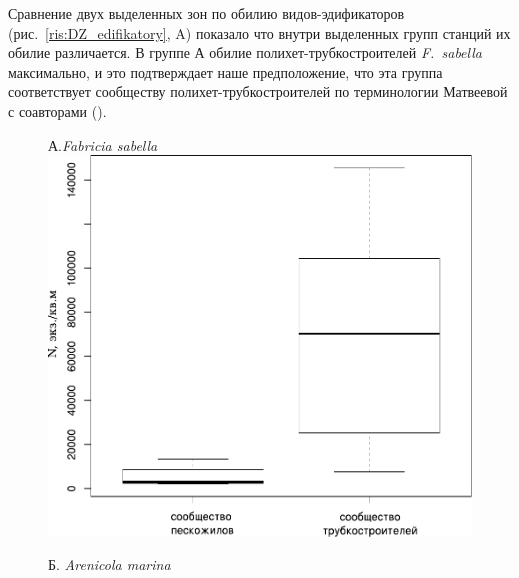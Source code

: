 Сравнение двух выделенных зон по обилию видов-эдификаторов (рис.~\ref{ris:DZ_edifikatory}, A) показало что внутри выделенных групп станций их обилие различается. В группе А обилие полихет-трубкостроителей \textit{F.~sabella} максимально, и это подтверждает наше предположение, что эта группа соответствует сообществу полихет-трубкостроителей по терминологии Матвеевой с соавторами (\cite{Matveeva_et_al_1955}). 
	\begin{figure}[p]
	\begin{minipage}[b]{.46\linewidth}
	\begin{center}
	{\footnotesize А.{\it Fabricia sabella}}
		\includegraphics[width=\linewidth]{../after_Deryuginskie/2_disser/Fabricia_in_zones1.pdf}
	\end{center}
	\end{minipage}
	\hfil %
	\begin{minipage}[b]{.46\linewidth}
	\begin{center}
	{\footnotesize Б. {\it Arenicola marina}}

\end{center}
\end{minipage}
\end{figure}
